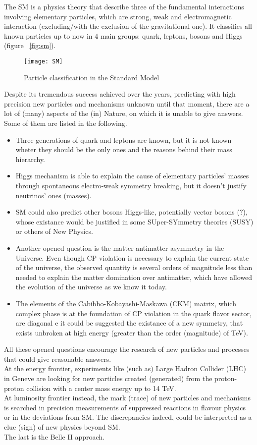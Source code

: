 The SM is a physics theory that describe three of the fundamental interactions involving elementary particles, which are strong, weak and electromagnetic interaction (excluding/with the exclusion of the gravitational one). It classifies all known particles up to now in 4 main groups: quark, leptons, bosons and Higgs (figure ~\vref{fig:sm}).


\begin{figure}[h]
\centering
\texttt{[image: SM]}
\caption{Particle classification in the Standard Model}
\label{fig:sm}
\end{figure}

Despite its tremendous success achieved over the years, predicting with high precision new particles and mechanisms unknown until that moment, there are a lot of (many) aspects of the (in) Nature, on which it is unable to give answers. Some of them are listed in the following.

\begin{itemize}
\item Three generations of quark and leptons are known, but it is not known wheter they should be the only ones and the reasons behind their mass hierarchy.
\item Higgs mechanism is able to explain the cause of elementary particles' masses through spontaneous electro-weak symmetry breaking, but it doesn't justify neutrinos' ones (masses).
\item SM could also predict other bosons Higgs-like, potentially vector bosons (?), whose existance would be justified in some SUper-SYmmetry theories (SUSY) or others of New Physics.
\item Another opened question is the matter-antimatter asymmetry in the Universe. Even though CP violation is necessary to explain the current state of the universe, the observed quantity is several orders of magnitude less than needed to explain the matter domination over antimatter, which have allowed the evolution of the universe as we know it today.
\item The elements of the Cabibbo-Kobayashi-Maskawa (CKM) matrix, which complex phase is at the foundation of CP violation in the quark flavor sector, are diagonal e it could be suggested the existance of a new symmetry, that exists unbroken at high energy (greater than the order (magnitude) of TeV).
\end{itemize}

All these opened questions encourage the research of new particles and processes that could give reasonable answers.\\
At the energy frontier, experiments like (such as) Large Hadron Collider (LHC) in Geneve are looking for new particles created (generated) from the proton-proton collision with a center mass energy up to 14 TeV.\\
At luminosity frontier instead, the mark (trace) of new particles and mechanisms is searched in precision measurements of suppressed reactions in flavour physics or in the deviations from SM. The discrepancies indeed, could be interpreted as a clue (sign) of new physics beyond SM. \\
The last is the Belle II approach.

